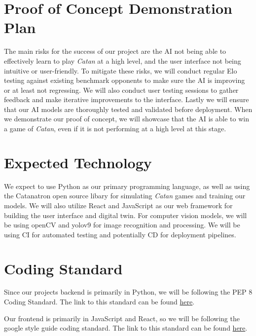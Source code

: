 \documentclass{article}
\begin{document}
\section{Proof of Concept Demonstration Plan}

\raggedright
The main risks for the success of our project are the AI not 
being able to effectively learn to play \emph{Catan} at a high level, 
and the user interface not being intuitive or user-friendly. 
To mitigate these risks, we will conduct regular Elo testing
against existing benchmark opponents to make sure the AI is 
improving or at least not regressing. We will also conduct user 
testing sessions to  gather feedback and make iterative improvements to the interface. 
Lastly we will ensure that our AI models are thoroughly tested and 
validated before deployment. When we demonstrate our proof of concept,
we will showcase that the AI is able to win a game of \emph{Catan}, even if
it is not performing at a high level at this stage.

\section{Expected Technology}

\raggedright
We expect to use Python as our primary programming 
language, as well as using the Catanatron open source 
libary for simulating \emph{Catan} games and training our models.
We will also utilize React and JavaScript as 
our web framework for building the user interface and 
digital twin. For computer vision models, we will be using
openCV and yolov9 for image recognition and processing. We will be using
CI for automated testing and potentially CD for deployment pipelines.


\section{Coding Standard}

Since our projects backend is primarily in Python, we will be following the PEP 8 Coding
Standard. The link to this standard can be found
\href{https://peps.python.org/pep-0008/}{here}.

\medskip

Our frontend is primarily in JavaScript and React, so we will be following the google style guide
coding standard. The link to this standard can be found \href{https://google.github.io/styleguide/jsguide.html}{here}.

\newpage{}
\end{document}
